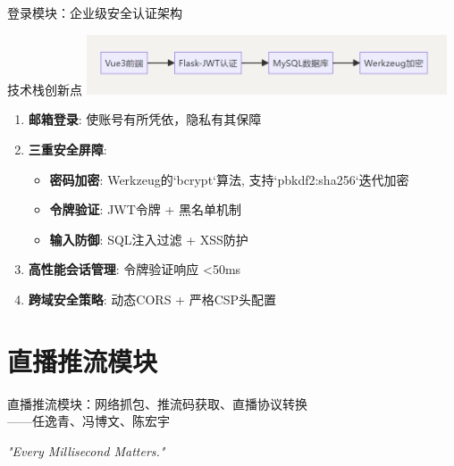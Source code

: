 \documentclass{beamer}
\begin{document}
\begin{frame}{登录模块：企业级安全认证架构}
    \begin{block}{技术栈创新点}
        \centering
        \includegraphics[width=0.8\textwidth]{pic/login_arch.png}
    \end{block}
    \begin{enumerate}
        \item \textbf{邮箱登录}: 使账号有所凭依，隐私有其保障
        \item \textbf{三重安全屏障}:
              \begin{itemize}
                  \item \textbf{密码加密}: Werkzeug的`bcrypt`算法, 支持`pbkdf2:sha256`迭代加密
                  \item \textbf{令牌验证}: JWT令牌 + 黑名单机制
                  \item \textbf{输入防御}: SQL注入过滤 + XSS防护
              \end{itemize}
        \item \textbf{高性能会话管理}: 令牌验证响应 <50ms
        \item \textbf{跨域安全策略}: 动态CORS + 严格CSP头配置
    \end{enumerate}
\end{frame}



\section{直播推流模块}

\begin {frame}{直播推流模块：网络抓包、推流码获取、直播协议转换 \\
    \hfill ——任逸青、冯博文、陈宏宇}

\centering
\textit{"Every Millisecond Matters."} \\
\vspace {1em}
\end{frame}
\end{document}
